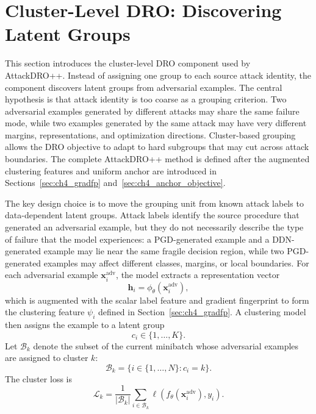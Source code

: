 \section{Cluster-Level DRO: Discovering Latent Groups}
\label{sec:ch4_attackdropp}

This section introduces the cluster-level DRO component used by AttackDRO++. Instead
of assigning one group to each source attack identity, the component discovers latent
groups from adversarial examples. The central hypothesis is that attack identity is
too coarse as a grouping criterion. Two adversarial examples generated by different
attacks may share the same failure mode, while two examples generated by the same
attack may have very different margins, representations, and optimization directions.
Cluster-based grouping allows the DRO objective to adapt to hard subgroups that may
cut across attack boundaries. The complete AttackDRO++ method is defined after the
augmented clustering features and uniform anchor are introduced in Sections~\ref{sec:ch4_gradfp}
and~\ref{sec:ch4_anchor_objective}.

The key design choice is to move the grouping unit from known attack labels to
data-dependent latent groups. Attack labels identify the source procedure that generated
an adversarial example, but they do not necessarily describe the type of failure that the
model experiences: a PGD-generated example and a DDN-generated example may lie near
the same fragile decision region, while two PGD-generated examples may affect different
classes, margins, or local boundaries.
For each adversarial example \(\mathbf{x}_i^{\mathrm{adv}}\), the model extracts a
representation vector
\begin{equation}
    \mathbf{h}_i = \phi_\theta(\mathbf{x}_i^{\mathrm{adv}}),
\end{equation}
which is augmented with the scalar label feature and gradient fingerprint to form
the clustering feature \(\psi_i\) defined in Section~\ref{sec:ch4_gradfp}. A
clustering model then assigns the example to a latent group
\begin{equation}
    c_i \in \{1,\ldots,K\}.
\end{equation}
Let \(\mathcal{B}_k\) denote the subset of the current minibatch whose adversarial
examples are assigned to cluster \(k\):
\begin{equation}
    \mathcal{B}_k
    =
    \{i \in \{1,\ldots,N\}: c_i = k\}.
\end{equation}
The cluster loss is
\begin{equation}
    \mathcal{L}_k
    =
    \frac{1}{|\mathcal{B}_k|}
    \sum_{i\in\mathcal{B}_k}
    \ell\!\left(
        f_\theta(\mathbf{x}_i^{\mathrm{adv}}),
        y_i
    \right).
    \label{eq:cluster_loss}
\end{equation}

